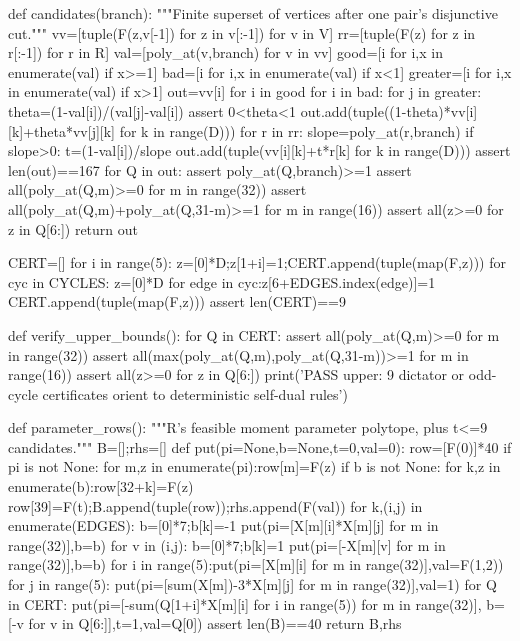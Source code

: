 \documentclass[UTF8,11pt,a4paper]{ctexart}
\begin{document}
\begin{CodeListing}
def candidates(branch):
    """Finite superset of vertices after one pair's disjunctive cut."""
    vv=[tuple(F(z,v[-1]) for z in v[:-1]) for v in V]
    rr=[tuple(F(z) for z in r[:-1]) for r in R]
    val=[poly_at(v,branch) for v in vv]
    good=[i for i,x in enumerate(val) if x>=1]
    bad=[i for i,x in enumerate(val) if x<1]
    greater=[i for i,x in enumerate(val) if x>1]
    out={vv[i] for i in good}
    for i in bad:
        for j in greater:
            theta=(1-val[i])/(val[j]-val[i])
            assert 0<theta<1
            out.add(tuple((1-theta)*vv[i][k]+theta*vv[j][k] for k in range(D)))
        for r in rr:
            slope=poly_at(r,branch)
            if slope>0:
                t=(1-val[i])/slope
                out.add(tuple(vv[i][k]+t*r[k] for k in range(D)))
    assert len(out)==167
    for Q in out:
        assert poly_at(Q,branch)>=1
        assert all(poly_at(Q,m)>=0 for m in range(32))
        assert all(poly_at(Q,m)+poly_at(Q,31-m)>=1 for m in range(16))
        assert all(z>=0 for z in Q[6:])
    return out

CERT=[]
for i in range(5):
    z=[0]*D;z[1+i]=1;CERT.append(tuple(map(F,z)))
for cyc in CYCLES:
    z=[0]*D
    for edge in cyc:z[6+EDGES.index(edge)]=1
    CERT.append(tuple(map(F,z)))
assert len(CERT)==9


def verify_upper_bounds():
    for Q in CERT:
        assert all(poly_at(Q,m)>=0 for m in range(32))
        assert all(max(poly_at(Q,m),poly_at(Q,31-m))>=1 for m in range(16))
        assert all(z>=0 for z in Q[6:])
    print('PASS upper: 9 dictator or odd-cycle certificates orient to deterministic self-dual rules')


def parameter_rows():
    """R's feasible moment parameter polytope, plus t<=9 candidates."""
    B=[];rhs=[]
    def put(pi=None,b=None,t=0,val=0):
        row=[F(0)]*40
        if pi is not None:
            for m,z in enumerate(pi):row[m]=F(z)
        if b is not None:
            for k,z in enumerate(b):row[32+k]=F(z)
        row[39]=F(t);B.append(tuple(row));rhs.append(F(val))
    for k,(i,j) in enumerate(EDGES):
        b=[0]*7;b[k]=-1
        put(pi=[X[m][i]*X[m][j] for m in range(32)],b=b)
        for v in (i,j):
            b=[0]*7;b[k]=1
            put(pi=[-X[m][v] for m in range(32)],b=b)
    for i in range(5):put(pi=[X[m][i] for m in range(32)],val=F(1,2))
    for j in range(5):
        put(pi=[sum(X[m])-3*X[m][j] for m in range(32)],val=1)
    for Q in CERT:
        put(pi=[-sum(Q[1+i]*X[m][i] for i in range(5)) for m in range(32)],
            b=[-v for v in Q[6:]],t=1,val=Q[0])
    assert len(B)==40
    return B,rhs



\end{CodeListing}
\end{document}

